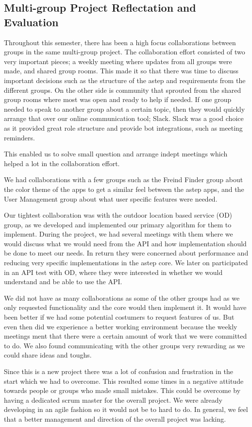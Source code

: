 \subsection{Multi-group Project Reflectation and Evaluation}
Throughout this semester, there has been a high focus collaborations between groups in the same multi-group project.
The collaboration effort consisted of two very important pieces; a weekly meeting where updates from all groups were made, and shared group rooms.
This made it so that there was time to discuss important decisions such as the structure of the \gls{astep} and requirements from the different groups.
On the other side is community that sprouted from the shared group rooms where most was open and ready to help if needed.
If one group needed to speak to another group about a certain topic, then they would quickly arrange that over our online communication tool; Slack.
Slack was a good choice as it provided great role structure and provide bot integrations, such as meeting reminders.

This enabled us to solve small question and arrange indept meetings which helped a lot in the collaboration effort.

We had collaborations with a few groups such as the Freind Finder group about the color theme of the apps to get a similar feel between the \gls{astep} apps, and the User Management group about what user specific features were needed.

Our tightest collaboration was with the outdoor location based service (OD) group, as we developed and implemented our primary algorithm for them to implement.
During the project, we had several meetings with them where we would discuss what we would need from the API and how implementation should be done to meet our needs.
In return they were concerned about performance and reducing very specific implementations in the \gls{astep} core.
We later on participated in an API test with OD, where they were interested in whether we would understand and be able to use the API.

We did not have as many collaborations as some of the other groups had as we only requested functionality and the core would then implement it.
It would have been better if we had some potential costumers to request features of us.
But even then did we experience a better working environment because the weekly meetings ment that there were a certain amount of work that we were committed to do.
We also found communicating with the other groups very rewarding as we could share ideas and toughs.

Since this is a new project there was a lot of confusion and frustration in the start which we had to overcome.
This resulted some times in a negative attitude towards people or groups who made small mistakes.
This could be overcome by having a dedicated scrum master for the overall project.
We were already developing in an agile fashion so it would not be to hard to do.
In general, we feel that a better management and direction of the overall project was lacking.
